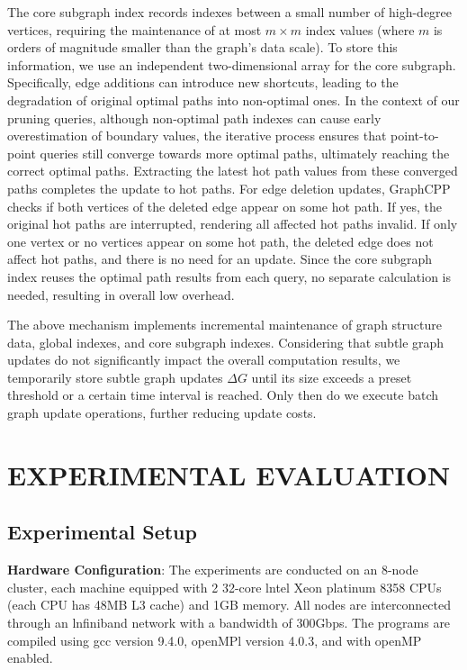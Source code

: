 \documentclass[lettersize,journal]{IEEEtran} %
\begin{document}
The core subgraph index records indexes between a small number of high-degree vertices, requiring the maintenance of at most $m \times m$ index values (where $m$ is orders of magnitude smaller than the graph's data scale). To store this information, we use an independent two-dimensional array for the core subgraph. Specifically, edge additions can introduce new shortcuts, leading to the degradation of original optimal paths into non-optimal ones. In the context of our pruning queries, although non-optimal path indexes can cause early overestimation of boundary values, the iterative process ensures that point-to-point queries still converge towards more optimal paths, ultimately reaching the correct optimal paths. Extracting the latest hot path values from these converged paths completes the update to hot paths. For edge deletion updates, GraphCPP checks if both vertices of the deleted edge appear on some hot path. If yes, the original hot paths are interrupted, rendering all affected hot paths invalid. If only one vertex or no vertices appear on some hot path, the deleted edge does not affect hot paths, and there is no need for an update. Since the core subgraph index reuses the optimal path results from each query, no separate calculation is needed, resulting in overall low overhead.

The above mechanism implements incremental maintenance of graph structure data, global indexes, and core subgraph indexes. Considering that subtle graph updates do not significantly impact the overall computation results, we temporarily store subtle graph updates $\Delta G$ until its size exceeds a preset threshold or a certain time interval is reached. Only then do we execute batch graph update operations, further reducing update costs.

\section{EXPERIMENTAL EVALUATION}
\subsection{Experimental Setup}

{\bf{Hardware Configuration}}: The experiments are conducted on an 8-node cluster, each machine equipped with 2 32-core lntel Xeon platinum 8358 CPUs (each CPU has 48MB L3 cache) and 1GB memory. All nodes are interconnected through an lnfiniband network with a bandwidth of 300Gbps. The programs are compiled using gcc version 9.4.0, openMPl version 4.0.3, and with openMP enabled.
    
\end{document}
